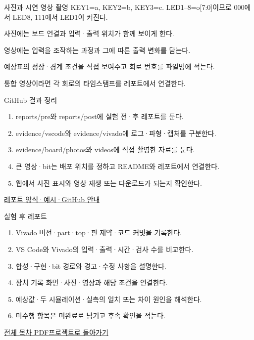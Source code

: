\begin{frame}{사진과 시연 영상 촬영}\relax
\small
KEY1=a, KEY2=b, KEY3=c. LED1–8=o[7:0]이므로 000에서 LED8, 111에서 LED1이 켜진다.\par\vspace{0.22cm}사진에는 보드 연결과 입력·출력 위치가 함께 보이게 한다.\par\vspace{0.22cm}영상에는 입력을 조작하는 과정과 그에 따른 출력 변화를 담는다.\par\vspace{0.22cm}예상표의 정상·경계 조건을 직접 보여주고 회로 번호를 파일명에 적는다.\par\vspace{0.22cm}통합 영상이라면 각 회로의 타임스탬프를 레포트에서 연결한다.\par
\end{frame}

\begin{frame}{GitHub 결과 정리}\relax
\small
\begin{enumerate}\setlength{\itemsep}{0.22cm}
\item reports/pre와 reports/post에 실험 전·후 레포트를 둔다.
\item evidence/vscode와 evidence/vivado에 로그·파형·캡처를 구분한다.
\item evidence/board/photos와 videos에 직접 촬영한 자료를 둔다.
\item 큰 영상·bit는 배포 위치를 정하고 README와 레포트에서 연결한다.
\item 웹에서 사진 표시와 영상 재생 또는 다운로드가 되는지 확인한다.
\end{enumerate}
\href{https://github.com/Glaysia/ece2_26_2_2/blob/daily/0910/example/fpga_projects_hdl/LAB1/docs/reports.md}{레포트 양식·예시·GitHub 안내}
\end{frame}

\begin{frame}{실험 후 레포트}\relax
\small
\begin{enumerate}\setlength{\itemsep}{0.22cm}
\item Vivado 버전·part·top·핀 제약·코드 커밋을 기록한다.
\item VS Code와 Vivado의 입력·출력·시간·검사 수를 비교한다.
\item 합성·구현·bit 경로와 경고·수정 사항을 설명한다.
\item 장치 기록 화면·사진·영상과 해당 조건을 연결한다.
\item 예상값·두 시뮬레이션·실측의 일치 또는 차이 원인을 해석한다.
\item 미수행 항목은 미완료로 남기고 후속 확인을 적는다.
\end{enumerate}
\href{04.LAB1_00_CONTENTS.pdf}{전체 목차 PDF}\quad\href{https://github.com/Glaysia/fpga-lab-example-legacy-09-decoder3to8/tree/e4d6725666068c25fb4a261ba10512cd2e350ad7}{프로젝트로 돌아가기}
\end{frame}
\endgroup

